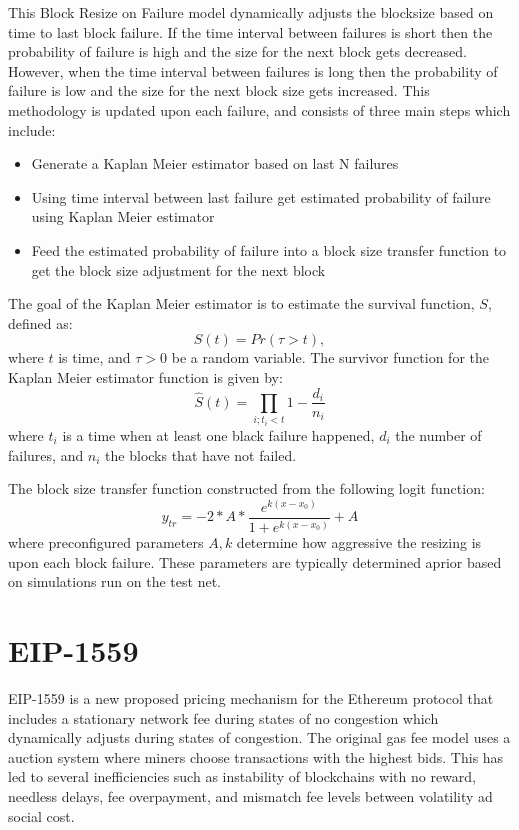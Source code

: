 \documentclass[peerreview]{ieeesyscoin}
\begin{document}
This Block Resize on Failure model dynamically adjusts the blocksize based on time to last block failure. If the time interval between failures is short then the probability of failure is high and the size for the next block gets decreased. However, when the time interval between failures is long then the probability of failure is low and the size for the next block size gets increased. This methodology is updated upon each failure, and consists of three main steps which include:
\begin{itemize}
\item Generate a Kaplan Meier estimator based on last N failures
\item Using time interval between last failure get estimated probability of failure using Kaplan Meier estimator
\item Feed the estimated probability of failure into a block size transfer function to get the block size adjustment for the next block
\end{itemize}

The goal of the Kaplan Meier estimator is to estimate the survival function, $S$, defined as:
\begin{equation}
S(t) = Pr(\tau > t),
\end{equation}
where $t$ is time, and  $\tau > 0$ be a random variable. The survivor function for the Kaplan Meier estimator function is given by:
\begin{equation}
\hat{S}(t) = \prod_{i; t_{i} < t} 1- \frac{d_{i}}{n_{i}}
\end{equation}
where $t_{i}$ is a time when at least one black failure happened, $d_{i}$ the number of failures, and $n_{i}$ the blocks that have not failed. 

The block size transfer function constructed from the following logit function:
\begin{equation}
y_{tr} = -2*A*\frac{e^{k(x-x_{0})}}{1+e^{k(x-x_{0})}} + A
\end{equation}
where preconfigured parameters ${A,k}$  determine how aggressive the resizing is upon each block failure. These parameters are typically determined aprior based on simulations run on the test net. 

\section{EIP-1559}

EIP-1559 is a new proposed pricing mechanism for the Ethereum protocol that includes a stationary network fee during states of no congestion which dynamically adjusts during states of congestion. The original gas fee model uses a auction system where miners choose transactions with the highest bids. This has led to several inefficiencies such as instability of blockchains with no reward, needless delays, fee overpayment, and mismatch fee levels between volatility ad social cost.
\end{document}
